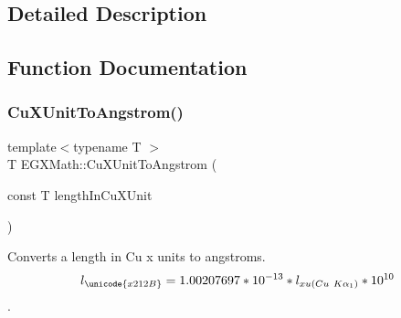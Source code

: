 \subsection{Detailed Description}


\subsection{Function Documentation}
\mbox{\label{group___e_g_x_math-_conversions-_length_conversions-_non-_s_i-_cu_x_unit-_non-_s_i_ga0ccb6fe91bb6437a1c41674613e2e395}} 
\subsubsection{\texorpdfstring{Cu\+X\+Unit\+To\+Angstrom()}{CuXUnitToAngstrom()}}
{\footnotesize\ttfamily template$<$typename T $>$ \\
T E\+G\+X\+Math\+::\+Cu\+X\+Unit\+To\+Angstrom (\begin{DoxyParamCaption}\item[{const T}]{length\+In\+Cu\+X\+Unit }\end{DoxyParamCaption})}



Converts a length in Cu x units to angstroms. \[ l_{\unicode{x212B}}=1.00207697*10^{-13} * l_{xu(Cu\ K\alpha_1)} * 10^{10} \]. 

